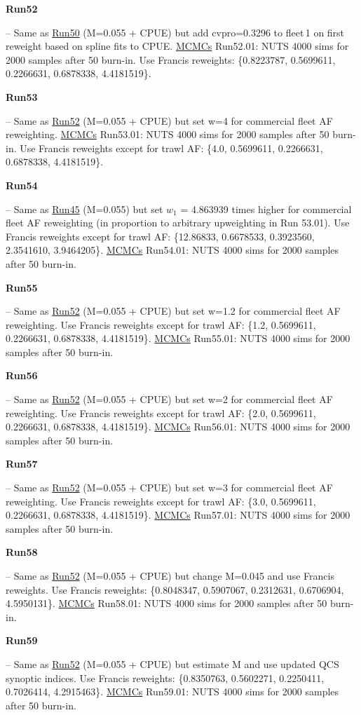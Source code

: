 \hypertarget{R52}{\textbf{Run52}} -- Same as \hyperlink{R50}{Run50} (M=0.055 + CPUE) but add cvpro=0.3296 to fleet\,1 on first reweight based on spline fits to CPUE. \underline{MCMCs} Run52.01: NUTS 4000 sims for 2000 samples after 50\pc{} burn-in. Use Francis reweights: \{0.8223787, 0.5699611, 0.2266631, 0.6878338, 4.4181519\}.

\hypertarget{R53}{\textbf{Run53}} -- Same as \hyperlink{R52}{Run52} (M=0.055 + CPUE) but set w=4 for commercial fleet AF reweighting. \underline{MCMCs} Run53.01: NUTS 4000 sims for 2000 samples after 50\pc{} burn-in. Use Francis reweights except for trawl AF: \{4.0, 0.5699611, 0.2266631, 0.6878338, 4.4181519\}.

\hypertarget{R54}{\textbf{Run54}} -- Same as \hyperlink{R45}{Run45} (M=0.055) but set $w_1$ = 4.863939 times higher for commercial fleet AF reweighting (in proportion to arbitrary upweighting in Run 53.01). Use Francis reweights except for trawl AF: \{12.86833, 0.6678533, 0.3923560, 2.3541610, 3.9464205\}. \underline{MCMCs} Run54.01: NUTS 4000 sims for 2000 samples after 50\pc{} burn-in.

\hypertarget{R55}{\textbf{Run55}} -- Same as \hyperlink{R52}{Run52} (M=0.055 + CPUE) but set w=1.2 for commercial fleet AF reweighting. Use Francis reweights except for trawl AF: \{1.2, 0.5699611, 0.2266631, 0.6878338, 4.4181519\}. \underline{MCMCs} Run55.01: NUTS 4000 sims for 2000 samples after 50\pc{} burn-in.

\hypertarget{R56}{\textbf{Run56}} -- Same as \hyperlink{R52}{Run52} (M=0.055 + CPUE) but set w=2 for commercial fleet AF reweighting. Use Francis reweights except for trawl AF: \{2.0, 0.5699611, 0.2266631, 0.6878338, 4.4181519\}. \underline{MCMCs} Run56.01: NUTS 4000 sims for 2000 samples after 50\pc{} burn-in.

\hypertarget{R57}{\textbf{Run57}} -- Same as \hyperlink{R52}{Run52} (M=0.055 + CPUE) but set w=3 for commercial fleet AF reweighting. Use Francis reweights except for trawl AF: \{3.0, 0.5699611, 0.2266631, 0.6878338, 4.4181519\}. \underline{MCMCs} Run57.01: NUTS 4000 sims for 2000 samples after 50\pc{} burn-in.

\hypertarget{R58}{\textbf{Run58}} -- Same as \hyperlink{R52}{Run52} (M=0.055 + CPUE) but change M=0.045 and use Francis reweights. Use Francis reweights: \{0.8048347, 0.5907067, 0.2312631, 0.6706904, 4.5950131\}. \underline{MCMCs} Run58.01: NUTS 4000 sims for 2000 samples after 50\pc{} burn-in.

\hypertarget{R59}{\textbf{Run59}} -- Same as \hyperlink{R52}{Run52} (M=0.055 + CPUE) but estimate M and use updated QCS synoptic indices. Use Francis reweights: \{0.8350763, 0.5602271, 0.2250411, 0.7026414, 4.2915463\}. \underline{MCMCs} Run59.01: NUTS 4000 sims for 2000 samples after 50\pc{} burn-in.

